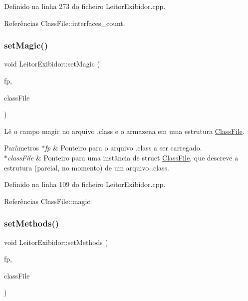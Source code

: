 Definido na linha 273 do ficheiro Leitor\+Exibidor.\+cpp.



Referências Class\+File\+::interfaces\+\_\+count.

\mbox{\label{classLeitorExibidor_a08d4a6ea1c0f054f6f2969afe96a1d99}} 
\subsubsection{\texorpdfstring{set\+Magic()}{setMagic()}}
{\footnotesize\ttfamily void Leitor\+Exibidor\+::set\+Magic (\begin{DoxyParamCaption}\item[{F\+I\+LE $\ast$}]{fp,  }\item[{\hyperlink{classClassFile}{Class\+File} $\ast$}]{class\+File }\end{DoxyParamCaption})\hspace{0.3cm}{\ttfamily [private]}}

Lê o campo magic no arquivo .class e o armazena em uma estrutura \hyperlink{classClassFile}{Class\+File}. 
\begin{DoxyParams}{Parâmetros}
{\em $\ast$fp} & Ponteiro para o arquivo .class a ser carregado. \\
\hline
{\em $\ast$class\+File} & Ponteiro para uma instância de struct \hyperlink{classClassFile}{Class\+File}, que descreve a estrutura (parcial, no momento) de um arquivo .class. \\
\hline
\end{DoxyParams}


Definido na linha 109 do ficheiro Leitor\+Exibidor.\+cpp.



Referências Class\+File\+::magic.

\mbox{\label{classLeitorExibidor_aa7ce00ed1b02c20c2eb7ff1b503563d5}} 
\subsubsection{\texorpdfstring{set\+Methods()}{setMethods()}}
{\footnotesize\ttfamily void Leitor\+Exibidor\+::set\+Methods (\begin{DoxyParamCaption}\item[{F\+I\+LE $\ast$}]{fp,  }\item[{\hyperlink{classClassFile}{Class\+File} $\ast$}]{class\+File }\end{DoxyParamCaption})\hspace{0.3cm}{\ttfamily [private]}}

